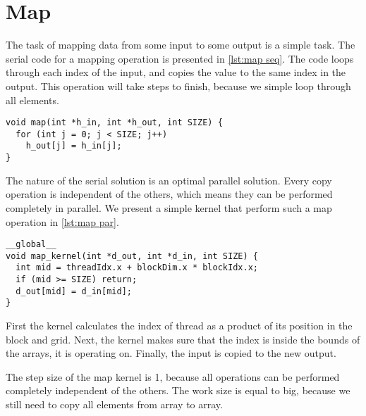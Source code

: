 \section{Map}
\label{sec:map}

The task of mapping data from some input to some output is a simple task.
The serial code for a mapping operation is presented in \cref{lst:map seq}.
The code loops through each index of the input, and copies the value to the same index in the output.
This operation will take  steps to finish, because we simple loop through all elements.

\begin{lstlisting}[caption={Serial map}, label={lst:map seq}]
void map(int *h_in, int *h_out, int SIZE) {
  for (int j = 0; j < SIZE; j++) 
    h_out[j] = h_in[j];
}
\end{lstlisting}

The nature of the serial solution is an optimal parallel solution.
Every copy operation is independent of the others, which means they can be performed completely in parallel.
We present a simple kernel that perform such a map operation in \cref{lst:map par}.

\begin{lstlisting}[caption={Map kernel}, label={lst:map par}]
__global__ 
void map_kernel(int *d_out, int *d_in, int SIZE) {
  int mid = threadIdx.x + blockDim.x * blockIdx.x;
  if (mid >= SIZE) return;
  d_out[mid] = d_in[mid];
}
\end{lstlisting}

First the kernel calculates the index of thread as a product of its position in the block and grid.
Next, the kernel makes sure that the index is inside the bounds of the arrays, it is operating on.
Finally, the input is copied to the new output.

The step size of the map kernel is 1, because all operations can be performed completely independent of the others.
The work size is equal to  big, because we still need to copy all elements from array to array.
